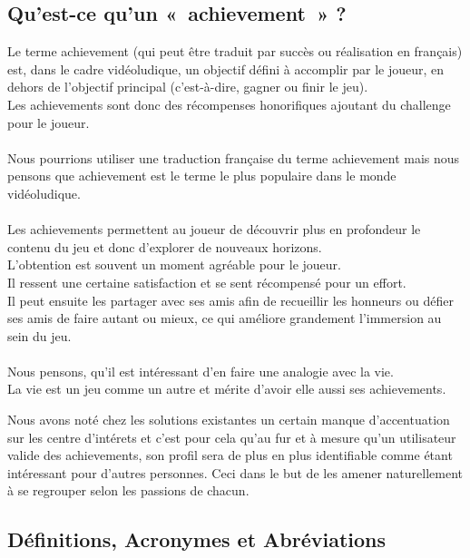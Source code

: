 \documentclass{life-fr}
\begin{document}
\subsection{Qu'est-ce qu'un «~achievement~» ?}
Le terme achievement (qui peut être traduit par succès ou réalisation en français) est, dans le cadre vidéoludique,  un objectif défini à accomplir par le joueur, en dehors de l’objectif principal (c’est-à-dire, gagner ou finir le jeu).\\
 Les achievements sont donc des récompenses honorifiques ajoutant du challenge pour le joueur.\\
\\
Nous pourrions utiliser une traduction française du terme achievement mais nous pensons que achievement est le terme le plus populaire dans le monde vidéoludique.\\
\\
Les achievements permettent au joueur de découvrir plus en profondeur le contenu du jeu et donc d’explorer de nouveaux horizons.\\
 L’obtention est souvent un moment agréable pour le joueur.\\
 Il ressent une certaine satisfaction et se sent récompensé pour un effort.\\
 Il peut ensuite les partager avec ses amis afin de recueillir les honneurs ou défier ses amis de faire autant ou mieux, ce qui améliore grandement l’immersion au sein du jeu.\\
\\
Nous pensons, qu’il est intéressant d’en faire une analogie avec la vie.\\
 La vie est un jeu comme un autre et mérite d’avoir elle aussi ses achievements.

 Nous avons noté chez les solutions existantes un certain manque d'accentuation sur les centre d'intérets et c'est pour cela qu'au fur et à mesure qu'un utilisateur valide des achievements, son profil sera de plus en plus identifiable comme étant intéressant pour d'autres personnes. Ceci dans le but de les amener naturellement à se regrouper selon les passions de chacun.

\subsection{Définitions, Acronymes et Abréviations}
\end{document}
